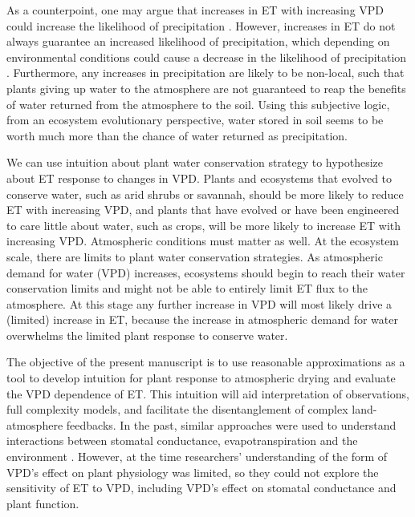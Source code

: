 As a counterpoint, one may argue that increases in ET with increasing
VPD could increase the likelihood of precipitation
\citep[e.g.,][]{Findell_2011}. However, increases in ET do not always
guarantee an increased likelihood of precipitation, which depending on
environmental conditions could cause a decrease in the likelihood of
precipitation \citep[][]{Gentine_2013}. Furthermore, any increases in
precipitation are likely to be non-local, such that plants giving up
water to the atmosphere are not guaranteed to reap the benefits of
water returned from the atmosphere to the soil. Using this subjective
logic, from an ecosystem evolutionary perspective, water stored in
soil seems to be worth much more than the chance of water returned as
precipitation.

We can use intuition about plant water conservation strategy to
hypothesize about ET response to changes in VPD. Plants and ecosystems
that evolved to conserve water, such as arid shrubs or savannah,
should be more likely to reduce ET with increasing VPD, and plants
that have evolved or have been engineered to care little about water,
such as crops, will be more likely to increase ET with increasing
VPD. Atmospheric conditions must matter as well. At the ecosystem
scale, there are limits to plant water conservation strategies. As
atmospheric demand for water (VPD) increases, ecosystems should begin
to reach their water conservation limits and might not be able to
entirely limit ET flux to the atmosphere. At this stage any further
increase in VPD will most likely drive a (limited) increase in ET,
because the increase in atmospheric demand for water overwhelms the
limited plant response to conserve water.

The objective of the present manuscript is to use reasonable
approximations as a tool to develop intuition for plant response to
atmospheric drying and evaluate the VPD dependence of ET. This
intuition will aid interpretation of observations, full complexity
models, and facilitate the disentanglement of complex land-atmosphere
feedbacks. In the past, similar approaches were used to understand
interactions between stomatal conductance, evapotranspiration and the
environment \citep[e.g.,][]{Jarvis_1986, Mcnaughton_1991}. However, at
the time researchers' understanding of the form of VPD's effect on
plant physiology was limited, so they could not explore the
sensitivity of ET to VPD, including VPD's effect on stomatal
conductance and plant function.

